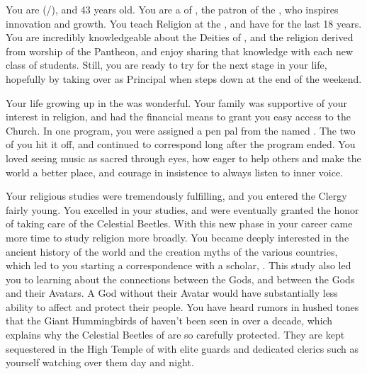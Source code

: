 \documentclass[char]{GL2020}
\begin{document}
\name{\cBeetle{}}

You are \cBeetle{\full} (\cBeetle{\they}/\cBeetle{\them}), and 43 years old. You are a \cBeetle{\cleric} of \cTechGod{}, the patron \cTechGod{\God} of the \pTech{}, who inspires innovation and growth. You teach Religion at the \pSchool{}, and have for the last 18 years. You are incredibly knowledgeable about the Deities of \pEarth{}, and the religion derived from worship of the Pantheon, and enjoy sharing that knowledge with each new class of students. Still, you are ready to try for the next stage in your life, hopefully by taking over as Principal when \cPrincipal{\full} steps down at the end of the weekend.

Your life growing up in the \pTech{} was wonderful. Your family was supportive of your interest in religion, and had the financial means to grant you easy access to the Church. In one program, you were assigned a pen pal from the \pFarm{} named \cMusic{\full}. The two of you hit it off, and continued to correspond long after the program ended. You loved seeing music as sacred through \cMusic{\their} eyes, how eager \cMusic{\they} \cMusic{\were} to help others and make the world a better place, and \cMusic{\their} courage in \cMusic{\their} insistence to always listen to \cMusic{\their} inner voice.

Your religious studies were tremendously fulfilling, and you entered the Clergy fairly young. You excelled in your studies, and were eventually granted the honor of taking care of the Celestial Beetles. With this new phase in your career came more time to study religion more broadly. You became deeply interested in the ancient history of the world and the creation myths of the various countries, which led to you starting a correspondence with a \pShippie{} scholar, \cEbbPriest{\full}. This study also led you to learning about the connections between the Gods, and between the Gods and their Avatars. A God without their Avatar would have substantially less ability to affect \pEarth{} and protect their people. You have heard rumors in hushed tones that the Giant Hummingbirds of \cFarmGod{} haven't been seen in over a decade, which explains why the Celestial Beetles of \cTechGod{} are so carefully protected. They are kept sequestered in the High Temple of \cTechGod{} with elite guards and dedicated clerics such as yourself watching over them day and night.
\end{document}
